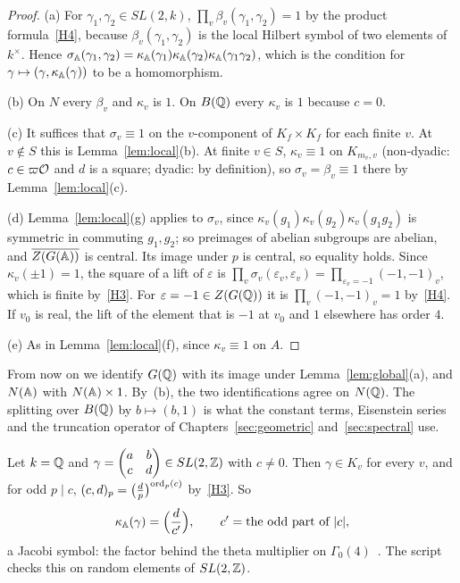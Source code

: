 \begin{proof}
(a) For $\gamma_1,\gamma_2\in SL(2,k)$, $\prod_v\beta_v(\gamma_1,\gamma_2)
=1$ by the product formula~\ref{H4}, because $\beta_v(\gamma_1,\gamma_2)$
is the local Hilbert symbol of two elements of $k^\times$. Hence
$\sigma_{\mathbb{A}}(\gamma_1,\gamma_2)=\kappa_{\mathbb{A}}(\gamma_1)\kappa_{\mathbb{A}}(\gamma_2)
\kappa_{\mathbb{A}}(\gamma_1\gamma_2)$, which is the condition for
$\gamma\mapsto(\gamma,\kappa_{\mathbb{A}}(\gamma))$ to be a homomorphism.

(b) On $N$ every $\beta_v$ and $\kappa_v$ is $1$. On $B(\mathbb{Q})$ every
$\kappa_v$ is $1$ because $c=0$.

(c) It suffices that $\sigma_v\equiv1$ on the $v$-component of
$K_f\times K_f$ for each finite $v$. At $v\notin S$ this is
Lemma~\ref{lem:local}(b). At finite $v\in S$, $\kappa_v\equiv1$ on
$K_{m_v,v}$ (non-dyadic: $c\in\varpi\mathcal{O}$ and $d$ is a square; dyadic: by
definition), so $\sigma_v=\beta_v\equiv1$ there by
Lemma~\ref{lem:local}(c).

(d) Lemma~\ref{lem:local}(g) applies to $\sigma_v$, since
$\kappa_v(g_1)\kappa_v(g_2)\kappa_v(g_1g_2)$ is symmetric in commuting
$g_1,g_2$; so preimages of abelian subgroups are abelian, and
$\overline{Z(G(\mathbb{A}))}$ is central. Its image under $p$ is central, so
equality holds. Since $\kappa_v(\pm1)=1$, the square of a lift of
$\varepsilon$ is $\prod_v\sigma_v(\varepsilon_v,\varepsilon_v)=
\prod_{\varepsilon_v=-1}(-1,-1)_v$, which is finite by~\ref{H3}. For
$\varepsilon=-1\in Z(G(\mathbb{Q}))$ it is $\prod_v(-1,-1)_v=1$ by~\ref{H4}. If
$v_0$ is real, the lift of the element that is $-1$ at $v_0$ and $1$
elsewhere has order $4$.

(e) As in Lemma~\ref{lem:local}(f), since $\kappa_v\equiv1$ on $A$.
\end{proof}

From now on we identify $G(\mathbb{Q})$ with its image under
Lemma~\ref{lem:global}(a), and $N(\mathbb{A})$ with $N(\mathbb{A})\times1$. By~(b), the
two identifications agree on $N(\mathbb{Q})$. The splitting over $B(\mathbb{Q})$ by
$b\mapsto(b,1)$ is what the constant terms, Eisenstein series and the
truncation operator of Chapters~\ref{sec:geometric} and~\ref{sec:spectral} use.

\begin{example}\label{ex:jacobi}
Let $k=\mathbb{Q}$ and $\gamma=\begin{pmatrix}a&b\\c&d\end{pmatrix}\in SL(2,\mathbb{Z})$
with $c\ne0$. Then $\gamma\in K_v$ for every $v$, and for odd
$p\mid c$, $(c,d)_p=\bigl(\tfrac dp\bigr)^{\operatorname{ord}_p(c)}$ by~\ref{H3}. So
\[
\kappa_{\mathbb{A}}(\gamma)=\Bigl(\frac{d}{c'}\Bigr),\qquad
c'=\text{the odd part of }|c|,
\]
a Jacobi symbol: the factor behind the theta multiplier on
$\Gamma_0(4)$~\cite{Ku69,Ge76}. The script checks this on random elements
of $SL(2,\mathbb{Z})$.
\end{example}

